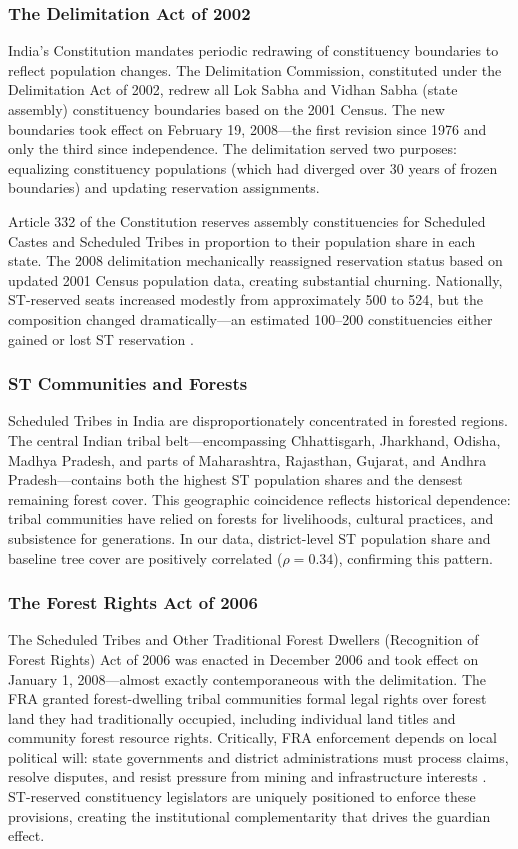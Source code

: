 \documentclass[12pt]{article}
\begin{document}
\subsubsection*{The Delimitation Act of 2002} India's Constitution mandates periodic redrawing of constituency boundaries to reflect population changes. The Delimitation Commission, constituted under the Delimitation Act of 2002, redrew all Lok Sabha and Vidhan Sabha (state assembly) constituency boundaries based on the 2001 Census. The new boundaries took effect on February 19, 2008---the first revision since 1976 and only the third since independence. The delimitation served two purposes: equalizing constituency populations (which had diverged over 30 years of frozen boundaries) and updating reservation assignments.

Article 332 of the Constitution reserves assembly constituencies for Scheduled Castes and Scheduled Tribes in proportion to their population share in each state. The 2008 delimitation mechanically reassigned reservation status based on updated 2001 Census population data, creating substantial churning. Nationally, ST-reserved seats increased modestly from approximately 500 to 524, but the composition changed dramatically---an estimated 100--200 constituencies either gained or lost ST reservation \citep{munshi2015}.

\subsubsection*{ST Communities and Forests} Scheduled Tribes in India are disproportionately concentrated in forested regions. The central Indian tribal belt---encompassing Chhattisgarh, Jharkhand, Odisha, Madhya Pradesh, and parts of Maharashtra, Rajasthan, Gujarat, and Andhra Pradesh---contains both the highest ST population shares and the densest remaining forest cover. This geographic coincidence reflects historical dependence: tribal communities have relied on forests for livelihoods, cultural practices, and subsistence for generations. In our data, district-level ST population share and baseline tree cover are positively correlated ($\rho = 0.34$), confirming this pattern.

\subsubsection*{The Forest Rights Act of 2006} The Scheduled Tribes and Other Traditional Forest Dwellers (Recognition of Forest Rights) Act of 2006 was enacted in December 2006 and took effect on January 1, 2008---almost exactly contemporaneous with the delimitation. The FRA granted forest-dwelling tribal communities formal legal rights over forest land they had traditionally occupied, including individual land titles and community forest resource rights. Critically, FRA enforcement depends on local political will: state governments and district administrations must process claims, resolve disputes, and resist pressure from mining and infrastructure interests \citep{anderson2011}. ST-reserved constituency legislators are uniquely positioned to enforce these provisions, creating the institutional complementarity that drives the guardian effect.
\end{document}
